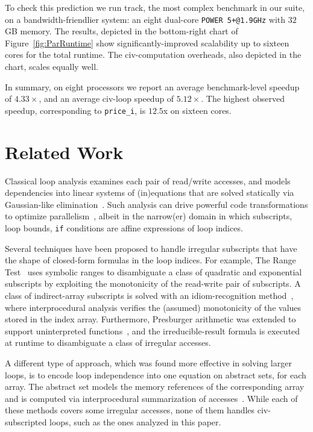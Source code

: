 \documentclass{sig-alternate}
\begin{document}
To check this prediction we run {\sc track}, the most complex benchmark in our suite, 
on a bandwidth-friendlier system: an eight dual-core {\tt POWER 5+@1.9GHz} with $32$GB memory. 
The results, depicted in the bottom-right chart of Figure~\ref{fig:ParRuntime} show 
significantly-improved scalability up to sixteen cores for the total runtime. 
The {\sc civ}-computation overheads, also depicted in the chart, scales equally well.  
 
In summary, on eight processors we report an average benchmark-level
speedup of $4.33\times$, and an average {\sc civ}-loop speedup of $5.12\times$. 
The highest observed speedup, corresponding to {\tt price\_i}, is $12.5$x 
on sixteen cores.


\section{Related Work} 
\label{sec:RelWork}

Classical loop analysis examines each pair of read/write accesses, %
and models dependencies into linear systems of (in)equations that are solved
statically  via Gaussian-like elimination~\cite{BanerjeeIneqTest,FeautrierDataflow}. %
Such analysis  can drive powerful code transformations to optimize 
parallelism~\cite{PolyhedralOpt}, albeit in the narrow(er) domain 
in which subscripts, loop bounds, {\tt if} conditions are affine 
expressions of loop indices.

Several techniques have been proposed to handle irregular subscripts that have
the shape of closed-form formulas in the loop indices. For example, 
The Range Test~\cite{Blume94RangeTest} uses symbolic 
ranges to disambiguate a class of quadratic and  
exponential subscripts by exploiting the monotonicity of the read-write pair 
of subscripts.   A class of indirect-array subscripts is solved with 
an idiom-recognition method~\cite{PaduaDemDrInterproc}, where interprocedural 
analysis verifies the (assumed) monotonicity of the values stored in the 
index array.
%
Furthermore, Presburger arithmetic was extended to support
uninterpreted functions~\cite{Pugh98NonlinPresb}, and the irreducible-result
formula is executed at runtime to disambiguate a class of irregular
accesses. 

A different type of approach, which was found more effective in
solving larger loops, is to encode loop independence into one equation 
on abstract sets, for each array. The abstract set models the
memory references of the corresponding array and is computed 
via interprocedural summarization of 
accesses~\cite{SUIF,Moon99PredArrDataFlow,SummaryMonot,LMAD}.
While each of these methods covers some irregular accesses,
none of them handles {\sc civ}-subscripted loops,   
such as the ones analyzed in this paper.
%
\end{document}

